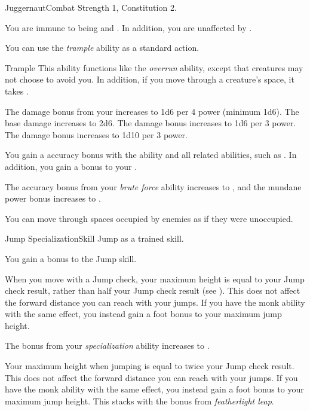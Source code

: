     \begin{feat}{Juggernaut}{Combat}
        \featpre Strength 1, Constitution 2.

         You are immune to being \slowed and \immobilized.
        In addition, you are unaffected by .

         You can use the \textit{trample} ability as a standard action.
        \begin{ability}{Trample}
            This ability functions like the \textit{overrun} ability, except that creatures may not choose to avoid you.
            In addition, if you move through a creature's space, it takes .

            \rankline
             The damage bonus from your  increases to 1d6 per 4 power (minimum 1d6).
             The base damage increases to 2d6.
             The damage bonus increases to 1d6 per 3 power.
             The damage bonus increases to 1d10 per 3 power.
        \end{ability}

         You gain a  accuracy bonus with the  ability and all related abilities, such as .
        In addition, you gain a  bonus to your .

         The accuracy bonus from your \textit{brute force} ability increases to , and the mundane power bonus increases to .

         You can move through spaces occupied by enemies as if they were unoccupied.
    \end{feat}

    \begin{feat}{Jump Specialization}{Skill}
        \featpre Jump as a trained skill.

         You gain a  bonus to the Jump skill.

         When you move with a Jump check, your maximum height is equal to your Jump check result, rather than half your Jump check result (see ).
        This does not affect the forward distance you can reach with your jumps.
        If you have the  monk ability with the same effect, you instead gain a  foot bonus to your maximum jump height.

         The bonus from your \textit{specialization} ability increases to .

         Your maximum height when jumping is equal to twice your Jump check result.
        This does not affect the forward distance you can reach with your jumps.
        If you have the  monk ability with the same effect, you instead gain a  foot bonus to your maximum jump height.
        This stacks with the bonus from \textit{featherlight leap}.
    \end{feat}

